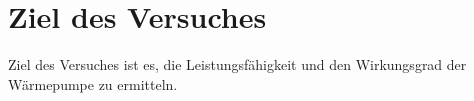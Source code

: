 \section{Ziel des Versuches}
\label{sec:Ziel des Versuches}
Ziel des Versuches ist es, die Leistungsfähigkeit und den Wirkungsgrad der Wärmepumpe zu ermitteln.

